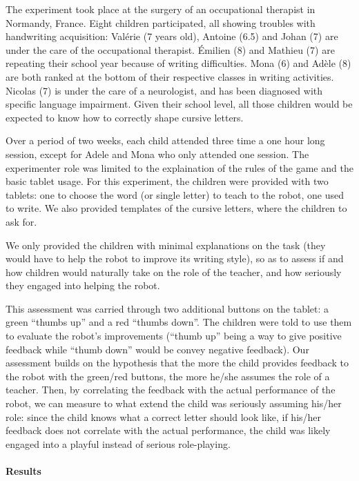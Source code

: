 \documentclass{article}
\begin{document}
The experiment took place at the surgery of an occupational therapist in
Normandy, France. Eight children participated, all showing troubles with
handwriting acquisition: Valérie (7 years old), Antoine (6.5) and Johan
(7) are under the care of the occupational therapist. Émilien (8) and Mathieu (7)
are repeating their school year because of writing difficulties. Mona (6) and
Adèle (8) are both ranked at the bottom of their respective classes in writing
activities. Nicolas (7) is under the care of a neurologist, and has been
diagnosed with specific language impairment. Given their school level, all those
children would be expected to know how to correctly shape cursive letters. 

Over a period of two weeks, each child attended three time a one hour long
session, except for Adele and Mona who only attended one session. The
experimenter role was limited to the explaination of the rules of the game and
the basic tablet usage. For this experiment, the children were provided with two
tablets: one to choose the word (or single letter) to teach to the robot, one
used to write. We also provided templates of the cursive letters, where the
children to ask for.

We only provided the children with minimal explanations on the task (they would
have to help the robot to improve its writing style), so as to assess if and how
children would naturally take on the role of the teacher, and how seriously they
engaged into helping the robot.

This assessment was carried through two additional buttons on the tablet: a
green ``thumbs up'' and a red ``thumbs down''. The children were told to use
them to evaluate the robot's improvements (``thumb up'' being a way to give
positive feedback while ``thumb down'' would be convey negative feedback). Our
assessment builds on the hypothesis that the more the child provides feedback to
the robot with the green/red buttons, the more he/she assumes the role of a
teacher. Then, by correlating the feedback with the actual performance of the
robot, we can measure to what extend the child was seriously assuming his/her
role: since the child knows what a correct letter should look like, if his/her
feedback does not correlate with the actual performance, the child was likely
engaged into a playful instead of serious role-playing.


\paragraph{Results}
\end{document}

